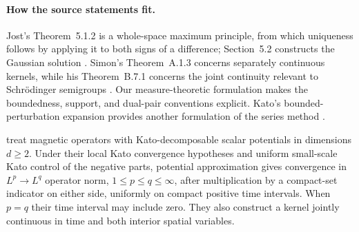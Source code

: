 \paragraph{How the source statements fit.}
Jost's Theorem~5.1.2 is a whole-space maximum principle, from which
uniqueness follows by applying it to both signs of a difference;
Section~5.2 constructs the Gaussian solution \parencite{Jost2013PDE}.
Simon's Theorem~A.1.3 concerns separately continuous kernels, while his
Theorem~B.7.1 concerns the joint continuity relevant to Schr\"odinger
semigroups \parencite{Simon1982Semigroups}. Our measure-theoretic formulation
makes the boundedness, support, and dual-pair conventions explicit.
Kato's bounded-perturbation expansion provides another formulation of
the series method \parencite[Chapter IX, Section 2]{Kato1995Perturbation}.

\textcite[Theorems~5.1 and~6.1]{BroderixHundertmarkLeschke2000}
treat magnetic operators with Kato-decomposable scalar potentials in
dimensions $d\geq2$.
Under their local Kato convergence hypotheses and uniform small-scale
Kato control of the negative parts, potential approximation gives
convergence in $L^p\to L^q$ operator norm, $1\leq p\leq q\leq\infty$,
after multiplication by a compact-set indicator on either side,
uniformly on compact positive time intervals. When $p=q$ their time
interval may include zero. They also construct a kernel jointly
continuous in time and both interior spatial variables.

